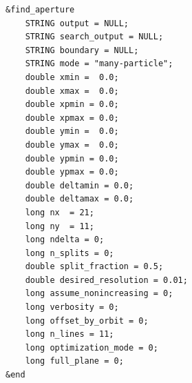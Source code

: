 \documentclass[11pt]{article}
\begin{document}
\begin{verbatim}
&find_aperture
    STRING output = NULL;
    STRING search_output = NULL;
    STRING boundary = NULL;
    STRING mode = "many-particle";
    double xmin =  0.0;
    double xmax =  0.0;
    double xpmin = 0.0;
    double xpmax = 0.0;
    double ymin =  0.0;
    double ymax =  0.0;
    double ypmin = 0.0;
    double ypmax = 0.0;
    double deltamin = 0.0;
    double deltamax = 0.0;
    long nx  = 21;
    long ny  = 11;
    long ndelta = 0;
    long n_splits = 0;
    double split_fraction = 0.5;
    double desired_resolution = 0.01;
    long assume_nonincreasing = 0;
    long verbosity = 0;    
    long offset_by_orbit = 0;
    long n_lines = 11;
    long optimization_mode = 0;
    long full_plane = 0;
&end
\end{verbatim}
\end{document}
